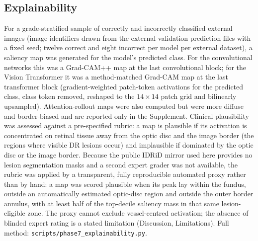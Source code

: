 \documentclass[11pt,a4paper]{article}
\begin{document}
\subsection{Explainability}
For a grade-stratified sample of correctly and incorrectly classified external
images (image identifiers drawn from the external-validation prediction files
with a fixed seed; twelve correct and eight incorrect per model per external
dataset), a saliency map was generated for the model's predicted class. For the
convolutional networks this was a Grad-CAM++ map \citep{chattopadhay2018gradcampp}
at the last convolutional block; for the Vision Transformer it was a
method-matched Grad-CAM map at the last transformer block (gradient-weighted
patch-token activations for the predicted class, class token removed, reshaped to
the $14\times14$ patch grid and bilinearly upsampled). Attention-rollout maps
\citep{abnar2020rollout} were also computed but were more diffuse and
border-biased and are reported only in the Supplement. Clinical plausibility was
assessed against a pre-specified rubric: a
map is plausible if its activation is concentrated on retinal tissue away from
the optic disc and the image border (the regions where visible DR lesions occur)
and implausible if dominated by the optic disc or the image border. Because the
public IDRiD mirror used here provides no lesion segmentation masks and a second
expert grader was not available, the rubric was applied by a transparent,
fully reproducible automated proxy rather than by hand: a map was scored
plausible when its peak lay within the fundus, outside an automatically estimated
optic-disc region and outside the outer border annulus, with at least half of the
top-decile saliency mass in that same lesion-eligible zone. The proxy cannot
exclude vessel-centred activation; the absence of blinded expert rating is a
stated limitation (Discussion, Limitations). Full method:
\texttt{scripts/phase7\_explainability.py}.
\end{document}
